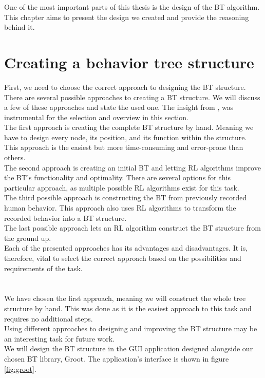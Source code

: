 One of the most important parts of this thesis is the design of the BT algorithm. This chapter aims to present the design we created and provide the reasoning behind it.

\section{Creating a behavior tree structure}
    First, we need to choose the correct approach to designing the BT structure. There are several possible approaches to creating a BT structure. We will discuss a few of these approaches and state the used one. The insight from \cite{BT_creation}, was instrumental for the selection and overview in this section.\\
    The first approach is creating the complete BT structure by hand. Meaning we have to design every node, its position, and its function within the structure. This approach is the easiest but more time-consuming and error-prone than others.\\
    The second approach is creating an initial BT and letting RL algorithms improve the BT's functionality and optimality. There are several options for this particular approach, as multiple possible RL algorithms exist for this task.\\
    The third possible approach is constructing the BT from previously recorded human behavior. This approach also uses RL algorithms to transform the recorded behavior into a BT structure.\\
    The last possible approach lets an RL algorithm construct the BT structure from the ground up.\\
    Each of the presented approaches has its advantages and disadvantages. It is, therefore, vital to select the correct approach based on the possibilities and requirements of the task.\\\\
    \\
        We have chosen the first approach, meaning we will construct the whole tree structure by hand. This was done as it is the easiest approach to this task and requires no additional steps.\\
        Using different approaches to designing and improving the BT structure may be an interesting task for future work.\\
        We will design the BT structure in the GUI application designed alongside our chosen BT library, Groot. The application's interface is shown in figure \ref{fig:groot}.\\\\
